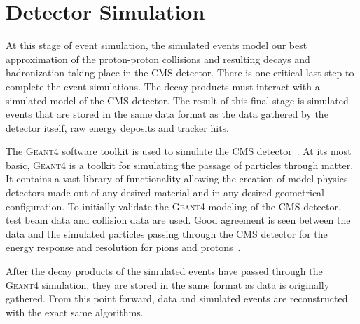 \section{Detector Simulation}
At this stage of event simulation, the simulated events model our best approximation
of the proton-proton collisions and resulting decays and hadronization taking place
in the CMS detector. There is one critical last step to complete the event
simulations. The decay products must interact with a simulated
model of the CMS detector. The result of this final stage is simulated events that
are stored in the same data format as the data gathered by the detector itself,
raw energy deposits and tracker hits.

The \textsc{Geant4} software toolkit is used to simulate the CMS 
detector~\cite{Agostinelli:2002hh}. At its most basic, \textsc{Geant4} is a 
toolkit for simulating the passage of particles through matter. It contains a 
vast library of functionality allowing the creation of model physics detectors
made out of any desired material and in any desired geometrical configuration.
To initially validate the \textsc{Geant4} modeling of the CMS detector, test beam data and
collision data are used. Good agreement is seen between the data and the
simulated particles passing through the CMS detector for the energy response
and resolution for pions and protons~\cite{geant4_cms_2017}.

After the decay products of the simulated events have passed through the \textsc{Geant4}
simulation, they are stored in the same format as data is originally gathered. From
this point forward, data and simulated events are reconstructed with the exact same 
algorithms.




